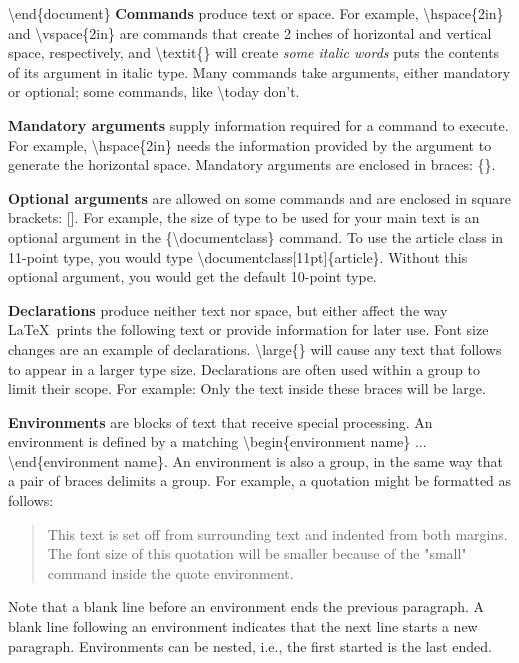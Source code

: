 \documentclass[12pt,openright]{book}
\begin{document}
\textbackslash end\{document\}
\vskip 0.2in
\textbf{Commands} produce text or space. For example, \textbackslash hspace\{2in\} and \textbackslash vspace\{2in\} are commands that create 2 inches of horizontal and vertical space, respectively, and \textbackslash textit\{\} will create \textit{some italic words} puts the contents of its argument in italic type. Many commands take arguments, either mandatory or optional; some commands, like \textbackslash today don’t.

\textbf{Mandatory arguments} supply information required for a command to execute. For
example, \textbackslash hspace\{2in\} needs the information provided by the argument to generate the horizontal space. Mandatory arguments are enclosed in braces: \{\}.

\textbf{Optional arguments} are allowed on some commands and are enclosed in square brackets: []. For example, the size of type to be used for your main text is an optional argument in the \{\textbackslash documentclass\} command. To use the article class in 11-point type, you would type \textbackslash documentclass[11pt]\{article\}. Without this optional argument, you would get the default 10-point type.

\textbf{Declarations} produce neither text nor space, but either affect the way \LaTeX\ prints the following text or provide information for later use. Font size changes are an example of declarations. \textbackslash large\{\} will cause any text that follows to appear in a larger type size. Declarations are often used within a group to limit their scope. For example: {\large Only the text inside these braces will be large.}


\textbf{Environments} are blocks of text that receive special processing. An environment is defined by a matching \textbackslash begin\{environment name\} ... \textbackslash end\{environment name\}. An environment is also a group, in the same way that a pair of braces delimits a group. For example, a quotation might be formatted as follows:

\begin{quote}
  \small This text is set off from surrounding text and indented from both margins. The font size of this quotation will be smaller because of the "small" command inside the quote environment.
\end{quote}

Note that a blank line before an environment ends the previous paragraph. A blank line following an environment indicates that the next line starts a new paragraph. Environments can be nested, i.e., the first started is the last ended.
\end{document}
